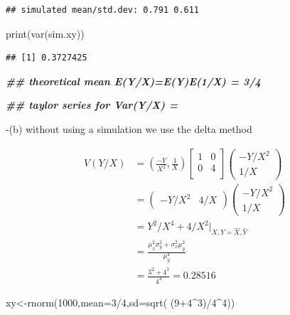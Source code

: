 \documentclass[
]{book}
\newenvironment{Shaded}{\begin{snugshade}}{\end{snugshade}}
\newcommand{\AttributeTok}[1]{\textcolor[rgb]{0.77,0.63,0.00}{#1}}
\newcommand{\DecValTok}[1]{\textcolor[rgb]{0.00,0.00,0.81}{#1}}
\newcommand{\DocumentationTok}[1]{\textcolor[rgb]{0.56,0.35,0.01}{\textbf{\textit{#1}}}}
\newcommand{\FunctionTok}[1]{\textcolor[rgb]{0.00,0.00,0.00}{#1}}
\newcommand{\NormalTok}[1]{#1}
\newcommand{\OtherTok}[1]{\textcolor[rgb]{0.56,0.35,0.01}{#1}}
\newcommand{\SpecialCharTok}[1]{\textcolor[rgb]{0.00,0.00,0.00}{#1}}
\theoremstyle{definition}
\theoremstyle{definition}
\theoremstyle{definition}
\theoremstyle{definition}
\theoremstyle{remark}
\begin{document}
\begin{verbatim}
## simulated mean/std.dev: 0.791 0.611
\end{verbatim}

\begin{Shaded}
\begin{Highlighting}[]
 \FunctionTok{print}\NormalTok{(}\FunctionTok{var}\NormalTok{(sim.xy))}
\end{Highlighting}
\end{Shaded}

\begin{verbatim}
## [1] 0.3727425
\end{verbatim}

\begin{Shaded}
\begin{Highlighting}[]
 \DocumentationTok{\#\# theoretical mean  E(Y/X)=E(Y)E(1/X) = 3/4}
 
 \DocumentationTok{\#\# taylor series for Var(Y/X) = }
\end{Highlighting}
\end{Shaded}

-(b) without using a simulation we use the delta method

\[
\begin{aligned}
V(Y/X)&=(\frac{-Y}{X^2},\frac{1}{X})\begin{bmatrix} 1 & 0\\
0 & 4\\
\end{bmatrix}\begin{pmatrix} -Y/X^2 \\ 1/X \end{pmatrix}\\
&=\begin{pmatrix} -Y/X^2 & 4/X \end{pmatrix}\begin{pmatrix} -Y/X^2 \\ 1/X \end{pmatrix}\\
&= Y^2/X^4 +4/X^2 |_{X,Y=\hat{X},\hat{Y}} \\
&= \frac{\mu_x^2\sigma_y^2 +\sigma_x^2\mu_y^2}{\mu_y^4}\\
&= \frac{3^2+4^3}{4^4} = 0.28516
\end{aligned}
\]

\begin{Shaded}
\begin{Highlighting}[]
\NormalTok{  xy}\OtherTok{\textless{}{-}}\FunctionTok{rnorm}\NormalTok{(}\DecValTok{1000}\NormalTok{,}\AttributeTok{mean=}\DecValTok{3}\SpecialCharTok{/}\DecValTok{4}\NormalTok{,}\AttributeTok{sd=}\FunctionTok{sqrt}\NormalTok{( (}\DecValTok{9}\SpecialCharTok{+}\DecValTok{4}\SpecialCharTok{\^{}}\DecValTok{3}\NormalTok{)}\SpecialCharTok{/}\DecValTok{4}\SpecialCharTok{\^{}}\DecValTok{4}\NormalTok{))}
\end{Highlighting}
\end{Shaded}
\end{document}

